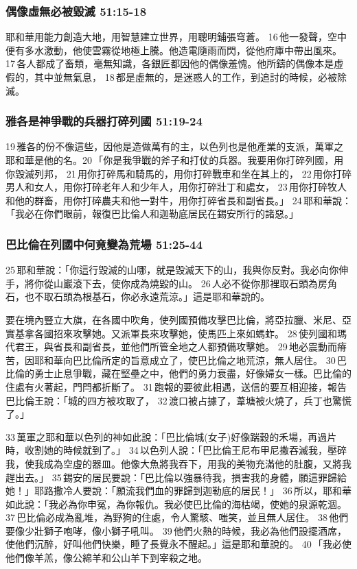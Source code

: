 \subsubsection{偶像虛無必被毀滅 51:15-18}
耶和華用能力創造大地，用智慧建立世界，用聰明鋪張穹蒼。 16 他一發聲，空中便有多水激動，他使雲霧從地極上騰。他造電隨雨而閃，從他府庫中帶出風來。 17 各人都成了畜類，毫無知識，各銀匠都因他的偶像羞愧。他所鑄的偶像本是虛假的，其中並無氣息， 18 都是虛無的，是迷惑人的工作，到追討的時候，必被除滅。 

\subsubsection{雅各是神爭戰的兵器打碎列國 51:19-24}
19 雅各的份不像這些，因他是造做萬有的主，以色列也是他產業的支派，萬軍之耶和華是他的名。20 「你是我爭戰的斧子和打仗的兵器。我要用你打碎列國，用你毀滅列邦， 21 用你打碎馬和騎馬的，用你打碎戰車和坐在其上的， 22 用你打碎男人和女人，用你打碎老年人和少年人，用你打碎壯丁和處女， 23 用你打碎牧人和他的群畜，用你打碎農夫和他一對牛，用你打碎省長和副省長。」 24 耶和華說：「我必在你們眼前，報復巴比倫人和迦勒底居民在錫安所行的諸惡。」

\subsubsection{巴比倫在列國中何竟變為荒場 51:25-44}
25 耶和華說：「你這行毀滅的山哪，就是毀滅天下的山，我與你反對。我必向你伸手，將你從山巖滾下去，使你成為燒毀的山。 26 人必不從你那裡取石頭為房角石，也不取石頭為根基石，你必永遠荒涼。」這是耶和華說的。

要在境內豎立大旗，在各國中吹角，使列國預備攻擊巴比倫，將亞拉臘、米尼、亞實基拿各國招來攻擊她。又派軍長來攻擊她，使馬匹上來如螞蚱。 28 使列國和瑪代君王，與省長和副省長，並他們所管全地之人都預備攻擊她。 29 地必震動而瘠苦，因耶和華向巴比倫所定的旨意成立了，使巴比倫之地荒涼，無人居住。 30 巴比倫的勇士止息爭戰，藏在堅壘之中，他們的勇力衰盡，好像婦女一樣。巴比倫的住處有火著起，門閂都折斷了。 31 跑報的要彼此相遇，送信的要互相迎接，報告巴比倫王說：「城的四方被攻取了， 32 渡口被占據了，葦塘被火燒了，兵丁也驚慌了。」

33 萬軍之耶和華以色列的神如此說：「巴比倫城(女子)好像踹穀的禾場，再過片時，收割她的時候就到了。」 34 以色列人說：「巴比倫王尼布甲尼撒吞滅我，壓碎我，使我成為空虛的器皿。他像大魚將我吞下，用我的美物充滿他的肚腹，又將我趕出去。」 35 錫安的居民要說：「巴比倫以強暴待我，損害我的身體，願這罪歸給她！」耶路撒冷人要說：「願流我們血的罪歸到迦勒底的居民！」 36 所以，耶和華如此說：「我必為你申冤，為你報仇。我必使巴比倫的海枯竭，使她的泉源乾涸。 37 巴比倫必成為亂堆，為野狗的住處，令人驚駭、嗤笑，並且無人居住。 38 他們要像少壯獅子咆哮，像小獅子吼叫。 39 他們火熱的時候，我必為他們設擺酒席，使他們沉醉，好叫他們快樂，睡了長覺永不醒起。」這是耶和華說的。 40 「我必使他們像羊羔，像公綿羊和公山羊下到宰殺之地。

